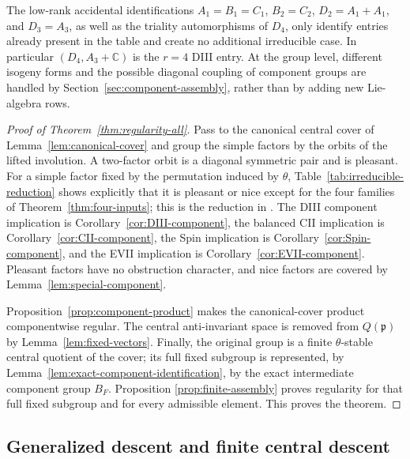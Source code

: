 \documentclass[11pt,reqno]{amsart}
\numberwithin{equation}{section}
\theoremstyle{definition}
\theoremstyle{remark}
\newcommand{\C}{\mathbb C}
\newcommand{\fp}{\mathfrak p}
\begin{document}
The low-rank accidental identifications
$A_1=B_1=C_1$, $B_2=C_2$, $D_2=A_1+A_1$, and $D_3=A_3$, as well as the
triality automorphisms of $D_4$, only identify entries already present in the
table and create no additional irreducible case.  In particular
$(D_4,A_3+\C)$ is the $r=4$ DIII entry.  At the group level, different
isogeny forms and the possible diagonal coupling of component groups are
handled by Section~\ref{sec:component-assembly}, rather than by adding new
Lie-algebra rows.

\begin{proof}[Proof of Theorem~\ref{thm:regularity-all}]
Pass to the canonical central cover of Lemma~\ref{lem:canonical-cover} and group
the simple factors by the orbits of the lifted involution.  A two-factor orbit
is a diagonal symmetric pair and is pleasant.  For a simple factor fixed by
the permutation induced by $\theta$, Table~\ref{tab:irreducible-reduction}
shows explicitly that it is pleasant or nice except for the four families of
Theorem~\ref{thm:four-inputs}; this is the reduction in
\cite[Tables~2--4 and Proposition~6.3]{Rubio}.  The DIII component implication
is Corollary~\ref{cor:DIII-component}, the balanced CII implication is
Corollary~\ref{cor:CII-component}, the Spin implication is
Corollary~\ref{cor:Spin-component}, and the EVII implication is
Corollary~\ref{cor:EVII-component}.  Pleasant factors have no obstruction
character, and nice factors are covered by Lemma~\ref{lem:special-component}.

Proposition~\ref{prop:component-product} makes the canonical-cover product
componentwise regular.  The central anti-invariant space is removed from
$Q(\fp)$ by Lemma~\ref{lem:fixed-vectors}.  Finally, the original group is a
finite $\theta$-stable central quotient of the cover; its full fixed subgroup is
represented, by Lemma~\ref{lem:exact-component-identification}, by the exact
intermediate component group $B_F$.  Proposition
\ref{prop:finite-assembly} proves regularity for that full fixed subgroup and
for every admissible element.  This proves the theorem.
\end{proof}

\subsection{Generalized descent and finite central descent}
\end{document}
